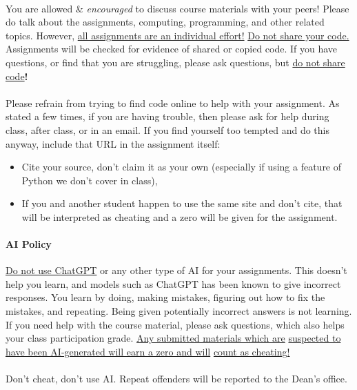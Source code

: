 \documentclass[letter,10pt]{article}
\begin{document}
\paragraph{}You are allowed \& \textit{encouraged} to discuss course materials with your peers! Please do talk about the assignments, computing, programming, and other related topics. However, \underline{all assignments are an individual effort!} \underline{Do not share your code.} Assignments will be checked for evidence of shared or copied code. If you have questions, or find that you are struggling, please ask questions, but \underline{do not share code}\textbf{!}

\paragraph{}Please refrain from trying to find code online to help with your assignment. As stated a few times, if you are having trouble, then please ask for help during class, after class, or in an email. If you find yourself too tempted and do this anyway, include that URL in the assignment itself:
\begin{itemize}
\item Cite your source, don't claim it as your own (especially if using a feature of Python we don't cover in class),
\item If you and another student happen to use the same site and don't cite, that will be interpreted as cheating and a zero will be given for the assignment.
\end{itemize}

\paragraph{AI Policy} \underline{Do not use ChatGPT} or any other type of AI for your assignments. This doesn't help you learn, and models such as ChatGPT has been known to give incorrect responses. You learn by doing, making mistakes, figuring out how to fix the mistakes, and repeating. Being given potentially incorrect answers is not learning. If you need help with the course material, please ask questions, which also helps your class participation grade. \underline{Any submitted materials which are} \underline{suspected to have been AI-generated will earn a zero and will} \underline{count as cheating!}

\paragraph{}Don't cheat, don't use AI. Repeat offenders will be reported to the Dean's office.
\end{document}
